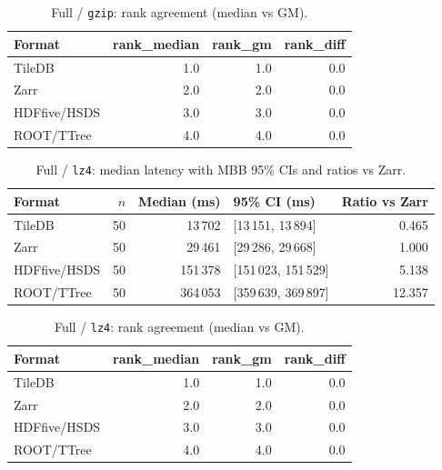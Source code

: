 \documentclass[nomenclature, english, bibtex]{kththesis}
\numberwithin{listing}{chapter}
\begin{document}
\begin{table}[H]
  \centering
  \caption{Full / \texttt{gzip}: rank agreement (median vs \gls{GM}).}
  \label{tab:np_full_gzip_rank}
  \begin{tabular}{l r r r}
    \toprule
    Format & rank\_median & rank\_gm & rank\_diff \\
    \midrule
    TileDB & 1.0 & 1.0 & 0.0 \\
    Zarr   & 2.0 & 2.0 & 0.0 \\
    \gls{HDFfive}/\gls{HSDS}   & 3.0 & 3.0 & 0.0 \\
    \gls{ROOT}/\gls{TTree}   & 4.0 & 4.0 & 0.0 \\
    \bottomrule
  \end{tabular}
\end{table}

\begin{table}[H]
  \centering
  \caption{Full / \texttt{lz4}: median latency with \gls{MBB} 95\% CIs and ratios vs Zarr.}
  \label{tab:np_full_lz4_median}
  \begin{tabular}{l r r l r}
    \toprule
    Format & $n$ & Median (ms) & 95\% \gls{CI} (ms) & Ratio vs Zarr \\
    \midrule
    TileDB & 50 & 13\,702 & [13\,151, 13\,894] & 0.465 \\
    Zarr   & 50 & 29\,461 & [29\,286, 29\,668] & 1.000 \\
    \gls{HDFfive}/\gls{HSDS}   & 50 & 151\,378 & [151\,023, 151\,529] & 5.138 \\
    \gls{ROOT}/\gls{TTree}   & 50 & 364\,053 & [359\,639, 369\,897] & 12.357 \\
    \bottomrule
  \end{tabular}
\end{table}

\begin{table}[H]
  \centering
  \caption{Full / \texttt{lz4}: rank agreement (median vs \gls{GM}).}
  \label{tab:np_full_lz4_rank}
  \begin{tabular}{l r r r}
    \toprule
    Format & rank\_median & rank\_gm & rank\_diff \\
    \midrule
    TileDB & 1.0 & 1.0 & 0.0 \\
    Zarr   & 2.0 & 2.0 & 0.0 \\
    \gls{HDFfive}/\gls{HSDS}   & 3.0 & 3.0 & 0.0 \\
    \gls{ROOT}/\gls{TTree}   & 4.0 & 4.0 & 0.0 \\
    \bottomrule
  \end{tabular}
\end{table}
\end{document}
